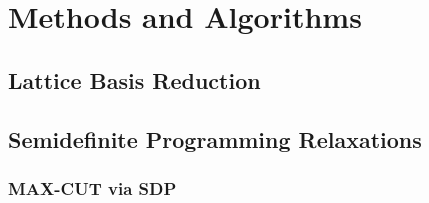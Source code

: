 \section{Methods and Algorithms}

\subsection{Lattice Basis Reduction}


\vspace*{3em}
\subsection{Semidefinite Programming Relaxations}

\subsubsection{MAX-CUT via SDP}


\vspace*{2em}

